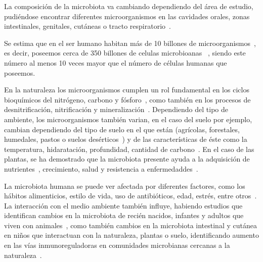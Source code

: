 La composición de la microbiota va cambiando dependiendo del área de estudio, pudiéndose encontrar diferentes microorganismos en las cavidades orales, zonas intestinales, genitales, cutáneas o tracto respiratorio~\cite{ursell2012interpersonal}.

Se estima que en el ser humano habitan más de 10 billones de microorganismos~\cite{sender2016revised}, es decir, poseemos cerca de 350 billones de celulas microbioanas~\cite{fijan2014microorganisms,ley2006ecological} , siendo este número al menos 10 veces mayor que el número de células humanas que poseemos.

En la naturaleza los microorganismos cumplen un rol fundamental en los ciclos bioquímicos del nitrógeno, carbono y fósforo~\cite{bitton1994role, gougoulias2014role}, como también en los procesos de desnitrificación, nitrificación y mineralización~\cite{bitton1994role, gougoulias2014role}. 
Dependiendo del tipo de ambiente, los microorganismos también varian, en el caso del suelo por ejemplo, cambian dependiendo del tipo de suelo en el que están (agrícolas, forestales, humedales, pastos o suelos desérticos~\cite{jiao2021linking}) y de las características de éste como la temperatura, hidaratación, profundidad, cantidad de carbono~\cite{bickel2020soil}.
En el caso de las plantas, se ha demostrado que la microbiota presente ayuda a la adquisición de nutrientes~\cite{hu2017probiotic}, crecimiento, salud y resistencia a enfermedaddes~\cite{lemanceau2017let,hardoim2015hidden,vorholt2012microbial,COMPANT201929}.


La microbiota humana se puede ver afectada por diferentes factores, como los hábitos alimenticios, estilo de vida, uso de antibióticos, edad, estrés, entre otros~\cite{altvecs2020interaction}. 
La interacción con el medio ambiente también influye, habiendo estudios que identifican cambios en la microbiota de recién nacidos, infantes y adultos que viven con animales~\cite{tun2017exposure, azad2013infant,kates2020household}, como también cambios en la microbiota intestinal y cutánea en niños que interactuan con la naturaleza, plantas o suelo, identificando aumento en las vías inmunoreguladoras en comunidades microbianas cercanas a la naturaleza~\cite{roslund2020biodiversity}.




